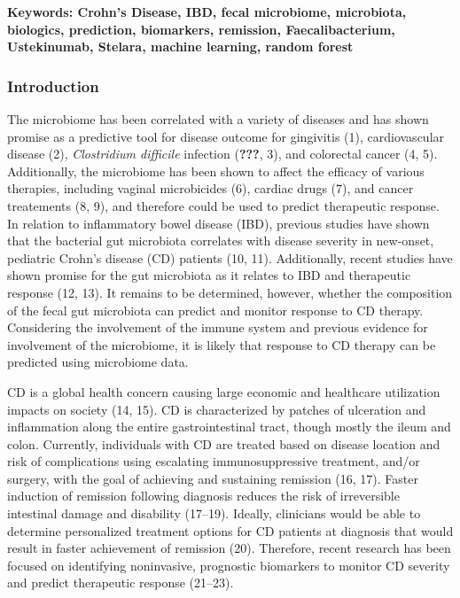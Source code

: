 \documentclass[11pt,]{article}
\begin{document}
\textbf{Keywords: Crohn's Disease, IBD, fecal microbiome, microbiota,
biologics, prediction, biomarkers, remission, Faecalibacterium,
Ustekinumab, Stelara, machine learning, random forest}

\newpage

\subsubsection{Introduction}\label{introduction}

The microbiome has been correlated with a variety of diseases and has
shown promise as a predictive tool for disease outcome for gingivitis
(1), cardiovascular disease (2), \emph{Clostridium difficile} infection
({\textbf{???}}, 3), and colorectal cancer (4, 5). Additionally, the
microbiome has been shown to affect the efficacy of various therapies,
including vaginal microbicides (6), cardiac drugs (7), and cancer
treatements (8, 9), and therefore could be used to predict therapeutic
response. In relation to inflammatory bowel disease (IBD), previous
studies have shown that the bacterial gut microbiota correlates with
disease severity in new-onset, pediatric Crohn's disease (CD) patients
(10, 11). Additionally, recent studies have shown promise for the gut
microbiota as it relates to IBD and therapeutic response (12, 13). It
remains to be determined, however, whether the composition of the fecal
gut microbiota can predict and monitor response to CD therapy.
Considering the involvement of the immune system and previous evidence
for involvement of the microbiome, it is likely that response to CD
therapy can be predicted using microbiome data.

CD is a global health concern causing large economic and healthcare
utilization impacts on society (14, 15). CD is characterized by patches
of ulceration and inflammation along the entire gastrointestinal tract,
though mostly the ileum and colon. Currently, individuals with CD are
treated based on disease location and risk of complications using
escalating immunosuppressive treatment, and/or surgery, with the goal of
achieving and sustaining remission (16, 17). Faster induction of
remission following diagnosis reduces the risk of irreversible
intestinal damage and disability (17--19). Ideally, clinicians would be
able to determine personalized treatment options for CD patients at
diagnosis that would result in faster achievement of remission (20).
Therefore, recent research has been focused on identifying noninvasive,
prognostic biomarkers to monitor CD severity and predict therapeutic
response (21--23).
\end{document}
